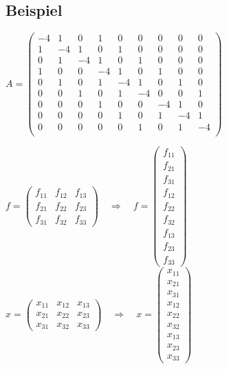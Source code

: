 \subsection{Beispiel}
\begin{frame}

\tiny\centering
	$	A = \left(
	\begin{array}{ccc|ccc|ccc}
		-4 & 1 & 0  &  1 & 0 & 0 & 0 & 0 & 0 \\
		 1 &-4 & 1  &  0 & 1 & 0 & 0 & 0 & 0 \\
		 0 & 1 & -4 &  1 & 0 & 1 & 0 & 0 & 0 \\\hline
		 1 & 0 & 0  & -4 & 1 & 0 & 1 & 0 & 0 \\
		 0 & 1 & 0  & 1 & -4 & 1 & 0 & 1 & 0 \\
		 0 & 0 & 1  & 0 & 1 & -4 & 0 & 0 & 1 \\\hline
		 0 & 0 & 0  & 1 & 0 & 0 & -4 & 1 & 0 \\
		 0 & 0 & 0  & 0 & 1 & 0 & 1 & -4 & 1 \\
		 0 & 0 & 0  & 0 & 0 & 1 & 0 & 1 & -4 \\
	\end{array}
	\right)
	$
	
	\vspace{3em}
	
	$f = \left(
	\begin{array}{ccc}
		f_{11} & f_{12} & f_{13} \\
		f_{21} & f_{22} & f_{23} \\
		f_{31} & f_{32} & f_{33} 
	\end{array}
	\right) \quad\Rightarrow\quad
	f = \left(
	\begin{array}{c}
		f_{11} \\
		f_{21}\\
		f_{31}\\
		f_{12}\\
		f_{22}\\
		f_{32}\\
		f_{13}\\
		f_{23}\\
		f_{33}
	\end{array}
	\right)$
	\hspace{3em}
	$x = \left(
	\begin{array}{ccc}
		x_{11} & x_{12} & x_{13} \\
		x_{21} & x_{22} & x_{23} \\
		x_{31} & x_{32} & x_{33} 
	\end{array}
	\right) \quad\Rightarrow\quad
	x = \left(
	\begin{array}{c}
		x_{11} \\
		x_{21}\\
		x_{31}\\
		x_{12}\\
		x_{22}\\
		x_{32}\\
		x_{13}\\
		x_{23}\\
		x_{33}
	\end{array}
	\right)$
	

\end{frame}
